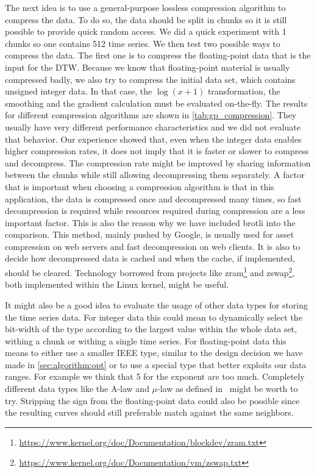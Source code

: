The next idea is to use a general-purpose lossless compression algorithm to compress the data. To do so, the data should be split in chunks so it is still possible to provide quick random access. We did a quick experiment with \SI{1}{\mega\byte} chunks so one contains \num{512} time series. We then test two possible ways to compress the data. The first one is to compress the floating-point data that is the input for the DTW\@. Because we know that floating-point material is usually compressed badly, we also try to compress the initial data set, which contains unsigned integer data. In that case, the $\log(x + 1)$ transformation, the smoothing and the gradient calculation must be evaluated on-the-fly. The results for different compression algorithms are shown in \autoref{tab:gp_compression}. They usually have very different performance characteristics and we did not evaluate that behavior. Our experience showed that, even when the integer data enables higher compression rates, it does not imply that it is faster or slower to compress and decompress. The compression rate might be improved by sharing information between the chunks while still allowing decompressing them separately. A factor that is important when choosing a compression algorithm is that in this application, the data is compressed once and decompressed many times, so fast decompression is required while resources required during compression are a less important factor. This is also the reason why we have included brotli into the comparison. This method, mainly pushed by Google, is usually used for asset compression on web servers and fast decompression on web clients. It is also to decide how decompressed data is cached and when the cache, if implemented, should be cleared. Technology borrowed from projects like zram\footnote{\url{https://www.kernel.org/doc/Documentation/blockdev/zram.txt}} and zswap\footnote{\url{https://www.kernel.org/doc/Documentation/vm/zswap.txt}}, both implemented within the Linux kernel, might be useful.

It might also be a good idea to evaluate the usage of other data types for storing the time series data. For integer data this could mean to dynamically select the bit-width of the type according to the largest value within the whole data set, withing a chunk or withing a single time series. For floating-point data this means to either use a smaller IEEE type, similar to the design decision we have made in \autoref{sec:algorithm:opt} or to use a special type that better exploits our data ranges. For example we think that \SI{5}{\bit} for the exponent are too much. Completely different data types like the A-law and $\mu$-law as defined in~\cite{G711} might be worth to try. Stripping the sign from the floating-point data could also be possible since the resulting curves should still preferable match against the same neighbors.
